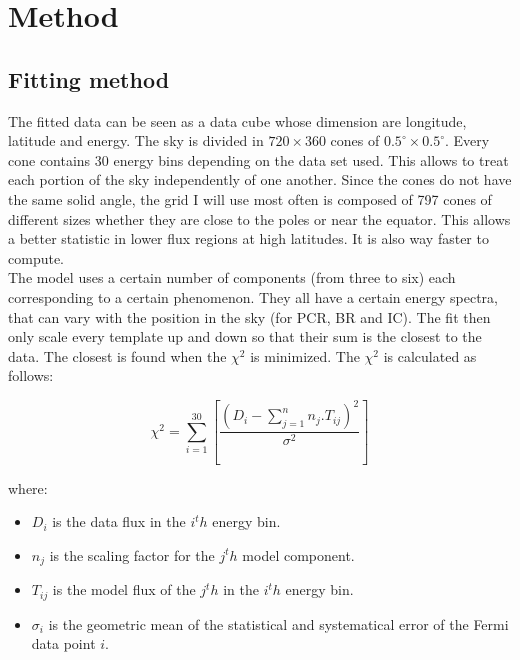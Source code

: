 \chapter{Method}
\label{ch:method}

\section{Fitting method}


The fitted data can be seen as a data cube whose dimension are longitude, latitude and energy. The sky is divided in $720\times360$ cones of $ 0.5^\circ \times 0.5^\circ $. Every cone contains 30 energy bins depending on the data set used. This allows to treat each portion of the sky independently of one another. Since the cones do not have the same solid angle, the grid I will use most often is composed of 797 cones of different sizes whether they are close to the poles or near the equator. This allows a better statistic in lower flux regions at high latitudes. It is also way faster to compute. \\

The model uses a certain number of components (from three to six) each corresponding to a certain phenomenon. They all have a certain energy spectra, that can vary with the position in the sky (for PCR, BR and IC). The fit then only scale every template up and down so that their sum is the closest to the data. The closest is found when the $\chi ^2$ is minimized. The $\chi ^2$ is calculated as follows:

\begin{equation}
\chi ^2 = \sum_{i=1}^{30}[\frac{(D_i - \sum_{j=1}^{n}n_j.T_{ij})^2}{\sigma^2}]
\end{equation}

where:
\begin{itemize}
\item $D_i$ is the data flux in the $i^th$ energy bin.
\item $n_j$ is the scaling factor for the $j^th$ model component.
\item $T_{ij}$ is the model flux of the $j^th$ in the $i^th$ energy bin.
\item $\sigma_i$ is the geometric mean of the statistical and systematical error of the Fermi data point $i$.
\end{itemize}

